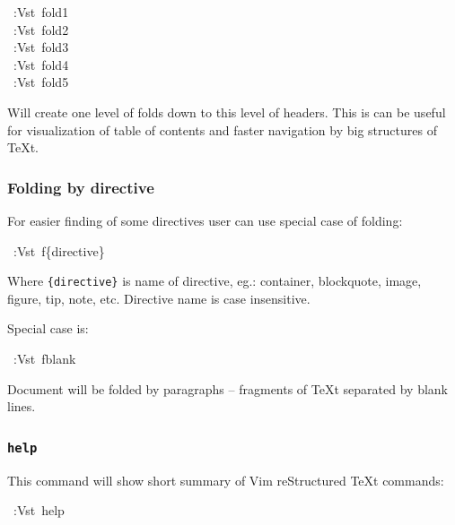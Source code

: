 \documentclass[12pt]{article}
\begin{document}
\begin{ttfamily}\begin{flushleft}
\mbox{~:Vst~fold1}\\
\mbox{~:Vst~fold2}\\
\mbox{~:Vst~fold3}\\
\mbox{~:Vst~fold4}\\
\mbox{~:Vst~fold5}\\
\end{flushleft}\end{ttfamily}

Will create one level of folds down to this level of headers. This is can be
useful for visualization of table of contents and faster navigation by big
structures of \TeX{}t.

\hypertarget{lfolding-by-directive}{}
\subsubsection{Folding by directive}

For easier finding of some directives user can use special case of folding:

\begin{ttfamily}\begin{flushleft}
\mbox{~:Vst~f\{directive\}}\\
\end{flushleft}\end{ttfamily}

Where \texttt{\{directive\}} is name of directive, eg.: container, blockquote,
image, figure, tip, note, etc. Directive name is case insensitive.

Special case is:

\begin{ttfamily}\begin{flushleft}
\mbox{~:Vst~fblank}\\
\end{flushleft}\end{ttfamily}

Document will be folded by paragraphs -- fragments of \TeX{}t separated by
blank lines.

\hypertarget{l9696help9696}{}
\subsubsection{\texttt{help}}

This command will show short summary of Vim reStructured \TeX{}t commands:

\begin{ttfamily}\begin{flushleft}
\mbox{~:Vst~help}\\
\end{flushleft}\end{ttfamily}
\end{document}

